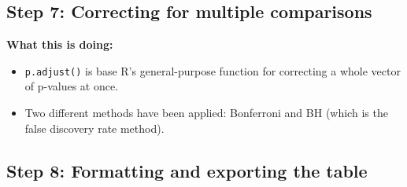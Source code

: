 \documentclass[
  letterpaper,
  DIV=11,
  numbers=noendperiod]{scrreprt}
\newenvironment{Shaded}{\begin{snugshade}}{\end{snugshade}}
\newcommand{\AttributeTok}[1]{\textcolor[rgb]{0.40,0.45,0.13}{#1}}
\newcommand{\FunctionTok}[1]{\textcolor[rgb]{0.28,0.35,0.67}{#1}}
\newcommand{\NormalTok}[1]{\textcolor[rgb]{0.00,0.23,0.31}{#1}}
\newcommand{\OtherTok}[1]{\textcolor[rgb]{0.00,0.23,0.31}{#1}}
\newcommand{\SpecialCharTok}[1]{\textcolor[rgb]{0.37,0.37,0.37}{#1}}
\newcommand{\StringTok}[1]{\textcolor[rgb]{0.13,0.47,0.30}{#1}}
\begin{document}
\subsection{Step 7: Correcting for multiple
comparisons}\label{step-7-correcting-for-multiple-comparisons}

\begin{Shaded}
\end{Shaded}

\textbf{What this is doing:}

\begin{itemize}
\item
  \texttt{p.adjust()} is base R's general-purpose function for
  correcting a whole vector of p-values at once.
\item
  Two different methods have been applied: Bonferroni and BH (which is
  the false discovery rate method).
\end{itemize}

\subsection{Step 8: Formatting and exporting the
table}\label{step-8-formatting-and-exporting-the-table}
\end{document}
